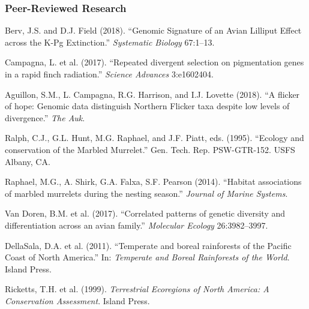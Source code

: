 \documentclass[11pt,letterpaper]{article}
\begin{document}
\subsubsection{Peer-Reviewed Research}
\begin{enumerate}[leftmargin=2em, label={[P\arabic*]}]
\item Berv, J.S. and D.J. Field (2018). ``Genomic Signature of an Avian Lilliput Effect across the K-Pg Extinction.'' \textit{Systematic Biology} 67:1--13.
\item Campagna, L. et al. (2017). ``Repeated divergent selection on pigmentation genes in a rapid finch radiation.'' \textit{Science Advances} 3:e1602404.
\item Aguillon, S.M., L. Campagna, R.G. Harrison, and I.J. Lovette (2018). ``A flicker of hope: Genomic data distinguish Northern Flicker taxa despite low levels of divergence.'' \textit{The Auk}.
\item Ralph, C.J., G.L. Hunt, M.G. Raphael, and J.F. Piatt, eds. (1995). ``Ecology and conservation of the Marbled Murrelet.'' Gen. Tech. Rep. PSW-GTR-152. USFS Albany, CA.
\item Raphael, M.G., A. Shirk, G.A. Falxa, S.F. Pearson (2014). ``Habitat associations of marbled murrelets during the nesting season.'' \textit{Journal of Marine Systems}.
\item Van Doren, B.M. et al. (2017). ``Correlated patterns of genetic diversity and differentiation across an avian family.'' \textit{Molecular Ecology} 26:3982--3997.
\item DellaSala, D.A. et al. (2011). ``Temperate and boreal rainforests of the Pacific Coast of North America.'' In: \textit{Temperate and Boreal Rainforests of the World}. Island Press.
\item Ricketts, T.H. et al. (1999). \textit{Terrestrial Ecoregions of North America: A Conservation Assessment}. Island Press.
\end{enumerate}
\end{document}
